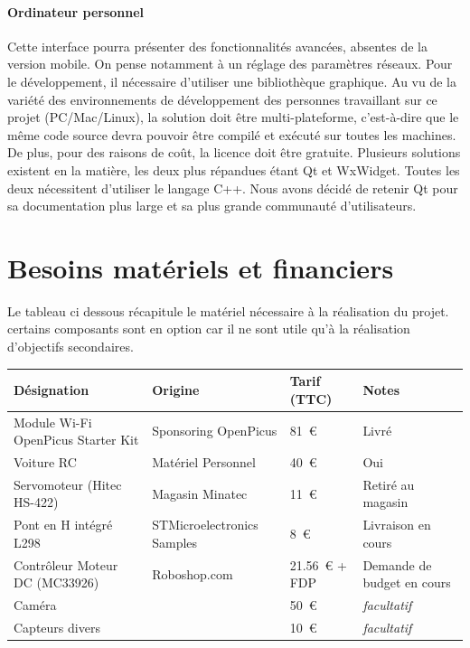 \documentclass[a4paper,12pt]{report}
\begin{document}
			\paragraph{Ordinateur personnel}
			Cette interface pourra présenter des fonctionnalités avancées, absentes de la version mobile. On pense notamment à un réglage des paramètres réseaux. Pour le développement, il nécessaire d’utiliser une bibliothèque graphique. Au vu de la variété des environnements de développement des personnes travaillant sur ce projet (PC/Mac/Linux), la solution doit être multi-plateforme, c'est-à-dire que le même code source devra pouvoir être compilé et exécuté sur toutes les machines. De plus, pour des raisons de coût, la licence doit être gratuite. Plusieurs solutions existent en la matière, les deux plus répandues étant Qt et WxWidget. Toutes les deux nécessitent d’utiliser le langage C++. Nous avons décidé de retenir Qt pour sa documentation plus large et sa plus grande communauté d’utilisateurs.
			
	\section{Besoins matériels et financiers}
	Le tableau ci dessous récapitule le matériel nécessaire à la réalisation du projet. certains composants sont en option car il ne sont utile qu’à la réalisation d’objectifs secondaires.
	
\begin{center}\scriptsize
	\begin{tabular}{|l|l|l|l|}
	\hline
	\texttt{} \footnotesize\bf{Désignation} & \footnotesize\bf{Origine} & \footnotesize\bf{Tarif (TTC)} & \footnotesize\bf{Notes} \\ \hline
	\texttt{} Module Wi-Fi OpenPicus Starter Kit  & Sponsoring OpenPicus & 81~€ & Livré \\ \hline
	\texttt{} Voiture RC & Matériel Personnel & 40~€ & Oui \\ \hline
	\texttt{} Servomoteur (Hitec HS-422) & Magasin Minatec & 11~€ & Retiré au magasin \\ \hline
	\texttt{} Pont en H intégré L298 & STMicroelectronics Samples & 8~€ & Livraison en cours \\ \hline
	\texttt{} Contrôleur Moteur DC (MC33926) & Roboshop.com & 21.56~€ + FDP & Demande de budget en cours \\ \hline
	\texttt{} Caméra &  & 50~€ & \emph{facultatif} \\ \hline
	\texttt{} Capteurs divers &  & 10~€ & \emph{facultatif} \\ \hline
	\end{tabular}
\end{center}
\end{document}
